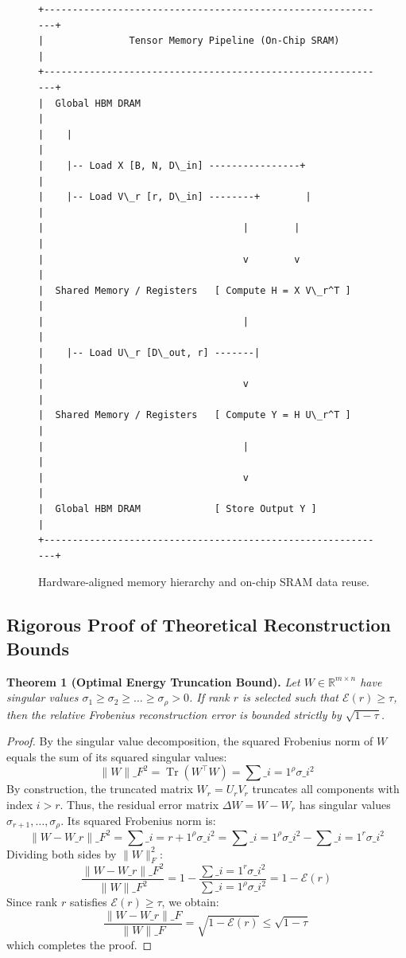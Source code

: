 \begin{figure}[H]
\centering
\begin{verbatim}
+-------------------------------------------------------------+
|               Tensor Memory Pipeline (On-Chip SRAM)         |
+-------------------------------------------------------------+
|  Global HBM DRAM                                            |
|    |                                                        |
|    |-- Load X [B, N, D\_in] ----------------+                |
|    |-- Load V\_r [r, D\_in] --------+        |                |
|                                   |        |                |
|                                   v        v                |
|  Shared Memory / Registers   [ Compute H = X V\_r^T ]        |
|                                   |                         |
|    |-- Load U\_r [D\_out, r] -------|                         |
|                                   v                         |
|  Shared Memory / Registers   [ Compute Y = H U\_r^T ]        |
|                                   |                         |
|                                   v                         |
|  Global HBM DRAM             [ Store Output Y ]             |
+-------------------------------------------------------------+
\end{verbatim}
\caption{Hardware-aligned memory hierarchy and on-chip SRAM data reuse.}
\label{fig:memory_hierarchy}
\end{figure}

\subsection{Rigorous Proof of Theoretical Reconstruction Bounds}

\textbf{Theorem 1 (Optimal Energy Truncation Bound).} \textit{Let $W \in \mathbb{R}^{m \times n}$ have singular values $\sigma_1 \ge \sigma_2 \ge \dots \ge \sigma_{\rho} > 0$. If rank $r$ is selected such that $\mathcal{E}(r) \ge \tau$, then the relative Frobenius reconstruction error is bounded strictly by $\sqrt{1 - \tau}$.}

\begin{proof}
By the singular value decomposition, the squared Frobenius norm of $W$ equals the sum of its squared singular values:
\[
\|W\|\_F^2 = \operatorname{Tr}(W^\top W) = \sum\_{i=1}^{\rho} \sigma\_i^2
\]
By construction, the truncated matrix $W_r = U_r V_r$ truncates all components with index $i > r$. Thus, the residual error matrix $\Delta W = W - W_r$ has singular values $\sigma_{r+1}, \dots, \sigma_{\rho}$.
Its squared Frobenius norm is:
\[
\|W - W\_r\|\_F^2 = \sum\_{i=r+1}^{\rho} \sigma\_i^2 = \sum\_{i=1}^{\rho} \sigma\_i^2 - \sum\_{i=1}^{r} \sigma\_i^2
\]
Dividing both sides by $\|W\|_F^2$:
\[
\frac{\|W - W\_r\|\_F^2}{\|W\|\_F^2} = 1 - \frac{\sum\_{i=1}^{r} \sigma\_i^2}{\sum\_{i=1}^{\rho} \sigma\_i^2} = 1 - \mathcal{E}(r)
\]
Since rank $r$ satisfies $\mathcal{E}(r) \ge \tau$, we obtain:
\[
\frac{\|W - W\_r\|\_F}{\|W\|\_F} = \sqrt{1 - \mathcal{E}(r)} \le \sqrt{1 - \tau}
\]
which completes the proof.
\end{proof}
